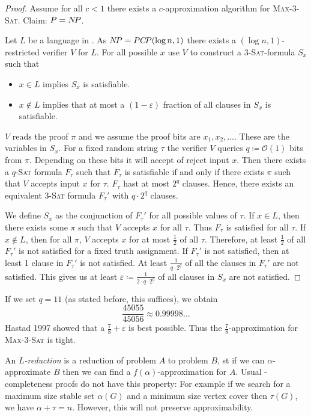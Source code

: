 \documentclass[../skript.tex]{subfiles}
\begin{document}
\begin{proof}
Assume for all $c < 1$ there exists a $c$-approximation algorithm for \textsc{Max-3-Sat}. Claim: $P = N \! P$.

Let $L$ be a language in \NP. As $N \! P = PC \! P(\log n, 1)$ there exists a $(\log n, 1)$-restricted verifier $V$ for $L$.
For all possible $x$ use $V$ to construct a \textsc{3-Sat}-formula $S_x$ such that
\begin{itemize}
\item $x \in L$ implies $S_x$ is satisfiable.
\item $x \notin L$ implies that at most a $(1-\varepsilon)$ fraction of all clauses in $S_x$ is satisfiable.
\end{itemize}
$V$ reads the proof $\pi$ and we assume the proof bits are $x_1, x_2, \ldots$. These are the variables in $S_x$.
For a fixed random string $\tau$ the verifier $V$ queries $q \coloneqq \mathcal{O}(1)$ bits from $\pi$.
Depending on these bits it will accept of reject input $x$.
Then there exists a $q$\textsc{-Sat} formula $F_\tau$ such that $F_\tau$ is satisfiable if and only if there exists $\pi$ such that $V$ accepts input $x$ for $\tau$.
$F_\tau$ hast at most $2^q$ clauses. Hence, there exists an equivalent \textsc{3-Sat} formula $F_\tau'$ with $q \cdot 2^q$ clauses.

We define $S_x$ as the conjunction of $F_\tau'$ for all possible values of $\tau$.
If $x \in L$, then there exists some $\pi$ such that $V$ accepts $x$ for all $\tau$. Thus $F_\tau$ is satisfied for all $\tau$.
If $x \notin L$, then for all $\pi$, $V$ accepts $x$ for at most $\frac{1}{2}$ of all $\tau$. Therefore, at least $\frac{1}{2}$ of all $F_\tau'$ is not satisfied for a fixed truth assignment. If $F_\tau'$ is not satisfied, then at least 1 clause in $F_\tau'$ is not satisfied. At least $\frac{1}{q \cdot 2^q}$ of all the clauses in $F_\tau'$ are not satisfied.
This gives us at least $\varepsilon \coloneqq \frac{1}{2 \cdot q \cdot 2^q}$ of all clauses in $S_x$ are not satisfied.
\end{proof}
If we set $q = 11$ (as stated before, this suffices), we obtain
\[
	\frac{45055}{45056} \approx 0.99998\ldots
\]
Hastad \lbrack{}1997\rbrack{} showed that a $\frac{7}{8} + \varepsilon$ is best possible. Thus the $\frac{7}{8}$-approximation for \textsc{Max-3-Sat} is tight.

An \emph{$L$-reduction} is a reduction of problem $A$ to problem $B$, \ac{st} if we can $\alpha$-approximate $B$ then we can find a $f(\alpha)$-approximation for $A$.
Usual \NP-completeness proofs do not have this property: For example if we search for a maximum size stable set $\alpha(G)$ and a minimum size vertex cover then $\tau(G)$, we have $\alpha + \tau = n$. However, this will not preserve approximability.
\end{document}
